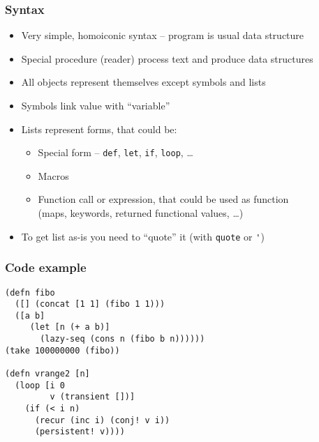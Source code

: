 \begin{frame}[t]
  \frametitle{Syntax}
  \begin{itemize}
  \item Very simple, homoiconic syntax  -- program is usual data structure
  \item Special procedure (reader) process text and produce data structures
  \item All objects represent themselves except symbols and lists
  \item Symbols link value with ``variable''
  \item Lists represent forms, that could be:
    \begin{itemize}
    \item Special form -- \texttt{def}, \texttt{let}, \texttt{if}, \texttt{loop}, \ldots{}
    \item Macros
    \item Function call or expression, that could be used as function\\
      (maps, keywords, returned functional values, \ldots{})
    \end{itemize}
  \item To get list as-is you need to ``quote'' it (with \texttt{quote} or \lstinline|'|)
  \end{itemize}
\end{frame}

\begin{frame}
  \frametitle{Code example}
\begin{lstlisting}
(defn fibo
  ([] (concat [1 1] (fibo 1 1)))
  ([a b]
     (let [n (+ a b)]
       (lazy-seq (cons n (fibo b n))))))
(take 100000000 (fibo))

(defn vrange2 [n]
  (loop [i 0 
         v (transient [])]
    (if (< i n)
      (recur (inc i) (conj! v i))
      (persistent! v))))
\end{lstlisting}
\end{frame}

